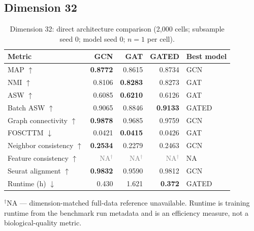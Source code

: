 \documentclass[10pt]{article}
\begin{document}
\subsection{Dimension 32}
\begin{table}[H]
\centering
\small
\caption{Dimension 32: direct architecture comparison (2,000 cells; subsample seed 0; model seed 0; $n=1$ per cell).}
\label{tab:dim32}
\begin{tabular}{@{}lrrrl@{}}
\toprule
Metric & GCN & GAT & GATED & Best model \\
\midrule
MAP $\uparrow$ & \textbf{0.8772} & 0.8615 & 0.8734 & GCN \\
NMI $\uparrow$ & 0.8106 & \textbf{0.8283} & 0.8273 & GAT \\
ASW $\uparrow$ & 0.6085 & \textbf{0.6210} & 0.6126 & GAT \\
Batch ASW $\uparrow$ & 0.9065 & 0.8846 & \textbf{0.9133} & GATED \\
Graph connectivity $\uparrow$ & \textbf{0.9878} & 0.9685 & 0.9759 & GCN \\
FOSCTTM $\downarrow$ & 0.0421 & \textbf{0.0415} & 0.0426 & GAT \\
Neighbor consistency $\uparrow$ & \textbf{0.2534} & 0.2279 & 0.2463 & GCN \\
Feature consistency $\uparrow$ & \textcolor{gray}{NA$^{\dagger}$} & \textcolor{gray}{NA$^{\dagger}$} & \textcolor{gray}{NA$^{\dagger}$} & NA \\
Seurat alignment $\uparrow$ & \textbf{0.9832} & 0.9590 & 0.9812 & GCN \\
Runtime (h) $\downarrow$ & 0.430 & 1.621 & \textbf{0.372} & GATED \\
\bottomrule
\end{tabular}
\begin{minipage}{0.92\linewidth}\footnotesize\vspace{2pt}$^{\dagger}$NA --- dimension-matched full-data reference unavailable. Runtime is training runtime from the benchmark run metadata and is an efficiency measure, not a biological-quality metric.\end{minipage}
\end{table}
\end{document}

